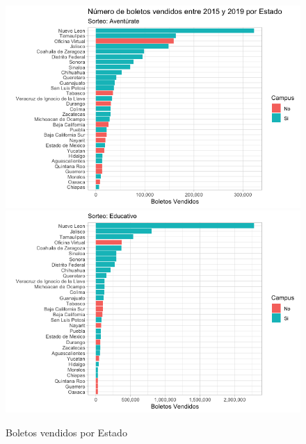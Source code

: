 \begin{figure}[H]
    \caption{Boletos vendidos por Estado}
    \label{fig:bolvendidos}
    \includegraphics[scale = 0.5]{Imagenes/boletos_av.png} \\
    \includegraphics[scale = 0.5]{Imagenes/boletos_ed.png} \\
    \centering
\end{figure} \\

